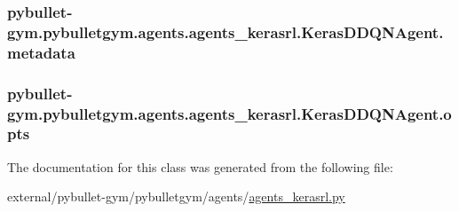 \subsubsection[{\texorpdfstring{metadata}{metadata}}]{\setlength{\rightskip}{0pt plus 5cm}pybullet-\/gym.\+pybulletgym.\+agents.\+agents\+\_\+kerasrl.\+Keras\+D\+D\+Q\+N\+Agent.\+metadata}\hypertarget{classpybullet-gym_1_1pybulletgym_1_1agents_1_1agents__kerasrl_1_1_keras_d_d_q_n_agent_a9cd4df508a4ca3519ebf6928248bf5ee}{}\label{classpybullet-gym_1_1pybulletgym_1_1agents_1_1agents__kerasrl_1_1_keras_d_d_q_n_agent_a9cd4df508a4ca3519ebf6928248bf5ee}
\subsubsection[{\texorpdfstring{opts}{opts}}]{\setlength{\rightskip}{0pt plus 5cm}pybullet-\/gym.\+pybulletgym.\+agents.\+agents\+\_\+kerasrl.\+Keras\+D\+D\+Q\+N\+Agent.\+opts}\hypertarget{classpybullet-gym_1_1pybulletgym_1_1agents_1_1agents__kerasrl_1_1_keras_d_d_q_n_agent_ac902ad5ea5a061bf4b982c516cc1c84c}{}\label{classpybullet-gym_1_1pybulletgym_1_1agents_1_1agents__kerasrl_1_1_keras_d_d_q_n_agent_ac902ad5ea5a061bf4b982c516cc1c84c}


The documentation for this class was generated from the following file\+:\begin{DoxyCompactItemize}
\item 
external/pybullet-\/gym/pybulletgym/agents/\hyperlink{agents__kerasrl_8py}{agents\+\_\+kerasrl.\+py}\end{DoxyCompactItemize}
